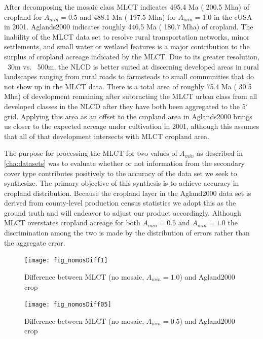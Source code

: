 After decomposing the mosaic class MLCT indicates
495.4 Ma ( 200.5 Mha) of cropland for
$A_{min}=0.5$ and 488.1 Ma ( 197.5 Mha) for
$A_{min}=1.0$ in the cUSA in 2001.  Aglands2000 indicates roughly
446.5 Ma ( 180.7 Mha) of cropland.  The
inability of the MLCT data set to resolve rural transportation
networks, minor settlements, and small water or wetland features is a
major contribution to the surplus of cropland acreage indicated by the
MLCT.  Due to its greater resolution, ~30m vs. ~500m, the NLCD is
better suited at discerning developed areas in rural landscapes
ranging from rural roads to farmsteads to small communities that do
not show up in the MLCT data. There is a total area of roughly
75.4 Ma ( 30.5 Mha)
of development remaining after subtracting the MLCT urban class from
all developed classes in the NLCD after they have both been aggregated
to the $5'$ grid. Applying this area as an offset to the cropland
area in Aglands2000 brings us closer to the expected acreage under
cultivation in 2001, although this assumes that all of that
development intersects with MLCT cropland area.

The purpose for processing the MLCT for two values of $A_{min}$ as
described in \autoref{cha:datasets} was to evaluate whether or not
information from the secondary cover type contributes positively to
the accuracy of the data set we seek to synthesize.  The primary
objective of this synthesis is to achieve accuracy in cropland
distribution.  Because the cropland layer in the Agland2000 data set
is derived from county-level production census statistics we adopt
this as the ground truth and will endeavor to adjust our product
accordingly.  Although MLCT overstates cropland acreage for both
$A_{min}=0.5$ and $A_{min}=1.0$ the discrimination among the two is made
by the distribution of errors rather than the aggregate error.


\begin{figure}[ht] 
  \centering


  \texttt{[image: fig\_nomosDiff1]}
  \caption{Difference between MLCT (no mosaic, $A_{min}=1.0$) and Agland2000 crop}
  \label{fig:nomosDiff1} 
\end{figure} 

\begin{figure}[ht] 
  \centering


  \texttt{[image: fig\_nomosDiff05]}
  \caption{Difference between MLCT (no mosaic, $A_{min}=0.5$) and Agland2000 crop}
  \label{fig:nomosDiff05} 
\end{figure} 

